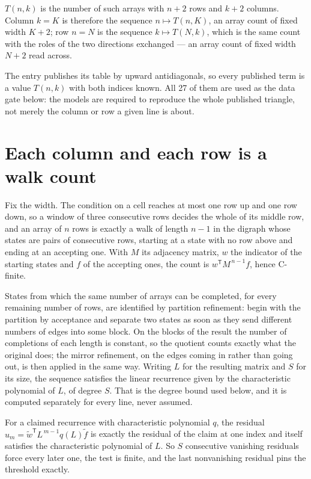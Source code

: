 \documentclass[11pt]{article}
\theoremstyle{definition}
\begin{document}
$T(n,k)$ is the number of such arrays with $n + 2$ rows and $k + 2$ columns. Column $k = K$ is therefore the sequence $n \mapsto T(n,K)$, an array count of fixed width $K + 2$; row $n = N$ is the sequence $k \mapsto T(N,k)$, which is the same count with the roles of the two directions exchanged --- an array count of fixed width $N + 2$ read across.

The entry publishes its table by upward antidiagonals, so every published term is a value $T(n,k)$ with both indices known. All 27 of them are used as the data gate below: the models are required to reproduce the whole published triangle, not merely the column or row a given line is about.

\section{Each column and each row is a walk count}

Fix the width. The condition on a cell reaches at most one row up and one row down, so a window of three consecutive rows decides the whole of its middle row, and an array of $n$ rows is exactly a walk of length $n-1$ in the digraph whose states are pairs of consecutive rows, starting at a state with no row above and ending at an accepting one. With $M$ its adjacency matrix, $w$ the indicator of the starting states and $f$ of the accepting ones, the count is $w^{\mathsf T}M^{\,n-1}f$, hence C-finite.

States from which the same number of arrays can be completed, for every remaining number of rows, are identified by partition refinement: begin with the partition by acceptance and separate two states as soon as they send different numbers of edges into some block. On the blocks of the result the number of completions of each length is constant, so the quotient counts exactly what the original does; the mirror refinement, on the edges coming in rather than going out, is then applied in the same way. Writing $L$ for the resulting matrix and $S$ for its size, the sequence satisfies the linear recurrence given by the characteristic polynomial of $L$, of degree $S$. That is the degree bound used below, and it is computed separately for every line, never assumed.

For a claimed recurrence with characteristic polynomial $q$, the residual $u_m = \tilde w^{\mathsf T}L^{\,m-1}q(L)\tilde f$ is exactly the residual of the claim at one index and itself satisfies the characteristic polynomial of $L$. So $S$ consecutive vanishing residuals force every later one, the test is finite, and the last nonvanishing residual pins the threshold exactly.
\end{document}
